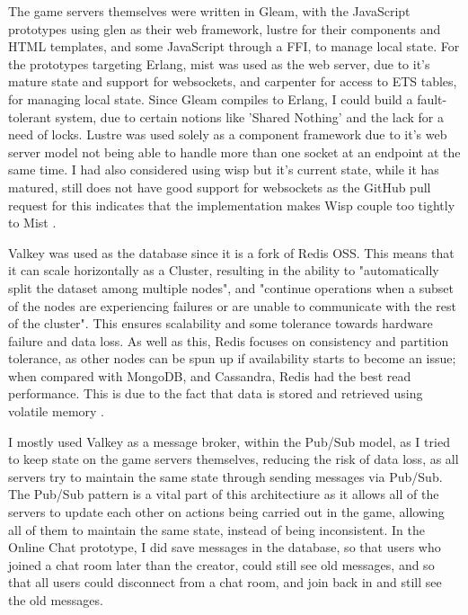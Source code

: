 \documentclass[]{final}
\begin{document}
The game servers themselves were written in Gleam, with the JavaScript prototypes
using glen as their web framework, lustre for their components and HTML templates,
and some JavaScript through a FFI, to manage local state. For the prototypes
targeting Erlang, mist was used as the web server, due to it's mature state
and support for websockets, and carpenter for access to ETS tables, for managing
local state. Since Gleam compiles to Erlang, I could build a fault-tolerant
system, due to certain notions like 'Shared Nothing' and the lack for a need
of locks. Lustre was used solely as a component framework due to it's web server model
not being able to handle more than one socket at an endpoint at the same time.
I had also considered using wisp but it's current state, while it has matured, still
does not have good support for websockets as the GitHub pull request for this indicates
that the implementation makes Wisp couple too tightly to Mist \cite{noauthor_websockets_nodate}.

Valkey was used as the database since it is a fork of Redis OSS.
This means that it can scale horizontally as a Cluster, resulting in
the ability to "automatically split the dataset among multiple nodes", and
"continue operations when a subset of the nodes are experiencing failures
or are unable to communicate with the rest of the cluster"\cite{noauthor_scale_nodate}.
This ensures scalability and some tolerance towards hardware failure and data loss.
As well as this, Redis focuses on consistency and partition tolerance, as other nodes
can be spun up if availability starts to become an issue; when compared with
MongoDB, and Cassandra, Redis had the best read performance. This is due to the fact that data is stored and retrieved using
volatile memory \cite{department_of_information_systems_university_of_nizwa_sultanate_of_oman_study_2022}.

I mostly used Valkey as a message broker, within the Pub/Sub model, as I
tried to keep state on the game servers themselves, reducing the risk of data
loss, as all servers try to maintain the same state through sending messages
via Pub/Sub. The Pub/Sub pattern is a vital part of this architectiure as it
allows all of the servers to update each other on actions being carried out
in the game, allowing all of them to maintain the same state,
instead of being inconsistent. In the Online Chat prototype,
I did save messages in the database, so that users who joined
a chat room later than the creator, could still see old messages, and so that all
users could disconnect from a chat room, and join back in and still see the old
messages.
\end{document}
